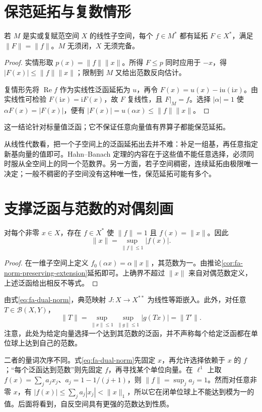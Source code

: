 \section{保范延拓与复数情形}
\begin{corollary}\label{cor:fa-norm-preserving-extension}
若 $M$ 是实或复赋范空间 $X$ 的线性子空间，每个 $f\in M^*$ 都有延拓 $F\in X^*$，满足 $\|F\|=\|f\|$。$M$ 无须闭，$X$ 无须完备。
\end{corollary}
\begin{proof}
实情形取 $p(x)=\|f\|\|x\|$。所得 $F\leq p$ 同时应用于 $-x$，得 $|F(x)|\leq\|f\|\|x\|$；限制到 $M$ 又给出范数反向估计。

复情形先将 $\operatorname{Re}f$ 作为实线性泛函延拓为 $u$，再令 $F(x)=u(x)-\mathrm i u(\mathrm ix)$。由实线性可检验 $F(\mathrm ix)=\mathrm iF(x)$，故 $F$ 复线性，且 $F|_M=f$。选择 $|\alpha|=1$ 使 $\alpha F(x)=|F(x)|$，便有 $|F(x)|=u(\alpha x)\leq\|f\|\|x\|$。
\end{proof}
这一结论针对标量值泛函；它不保证任意向量值有界算子都能保范延拓。

从线性代数看，把一个子空间上的泛函延拓出去并不难：补足一组基，再任意指定新基向量的值即可。Hahn--Banach 定理的内容在于这些值不能任意选择，必须同时服从全空间上的同一个范数界。另一方面，若子空间稠密，连续延拓由极限唯一决定；一般不稠密的子空间没有这种唯一性，保范延拓可能有多个。

\section{支撑泛函与范数的对偶刻画}
\begin{proposition}\label{prop:fa-norming-functional}
对每个非零 $x\in X$，存在 $f\in X^*$ 使 $\|f\|=1$ 且 $f(x)=\|x\|$。因此
\begin{equation}
 \|x\|=\sup_{\|f\|\leq1}|f(x)|.
 \label{eq:fa-dual-norm}
\end{equation}
\end{proposition}
\begin{proof}
在一维子空间上定义 $f_0(\alpha x)=\alpha\|x\|$，其范数为一。由推论\ref{cor:fa-norm-preserving-extension}延拓即可。上确界不超过 $\|x\|$ 来自对偶范数定义，上述泛函给出相反不等式。
\end{proof}
由式\eqref{eq:fa-dual-norm}，典范映射 $J:X\to X^{**}$ 为线性等距嵌入。此外，对任意 $T\in\mathcal B(X,Y)$，
\[
 \|T\|=\sup_{\|x\|\leq1}\sup_{\|g\|\leq1}|g(Tx)|=\|T'\|.
\]
注意，此处为给定向量选择一个达到其范数的泛函，并不声称每个给定泛函都在单位球上达到自己的范数。

二者的量词次序不同。式\eqref{eq:fa-dual-norm}先固定 $x$，再允许选择依赖于 $x$ 的 $f$；“每个泛函达到范数”则先固定 $f$，再寻找某个单位向量。在 $\ell^1$ 上取 $f(x)=\sum_j a_jx_j$、$a_j=1-1/(j+1)$，则 $\|f\|=\sup_ja_j=1$。然而对任意非零 $x$，有 $|f(x)|\leq\sum_ja_j|x_j|<\|x\|_1$，所以它在闭单位球上不能达到模为一的值。后面将看到，自反空间具有更强的范数达到性质。

